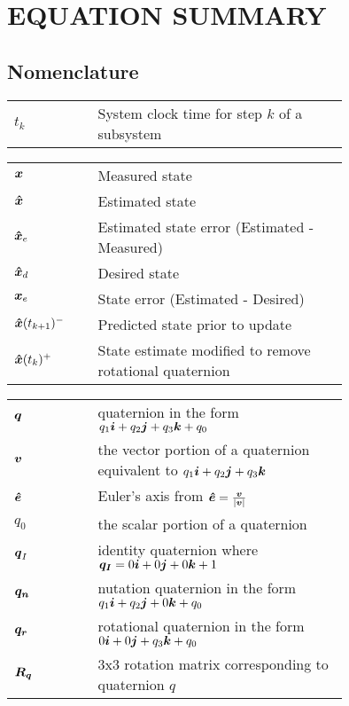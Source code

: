 \chapter{EQUATION SUMMARY}
\label{chap:EquationSummary}

\section{Nomenclature}

\begin{nomenclature}
\begin{tabular}{lp{0.75\linewidth}}
  $t_k$ & System clock time for step $k$ of a subsystem\\
\end{tabular}

\begin{tabular}{lp{0.75\linewidth}}
  $\boldsymbol{x}$ & Measured state \\
  $\boldsymbol{\hat{x}}$ & Estimated state \\
  $\boldsymbol{\hat{x}}_e$ & Estimated state error (Estimated - Measured)\\
  $\boldsymbol{\hat{x}}_d$ & Desired state \\
  $\boldsymbol{x}_e$ & State error (Estimated - Desired) \\
  $\boldsymbol{\hat{x}}(t_{k+1})^-$ & Predicted state prior to update \\
  $\boldsymbol{\hat{x}}(t_k)^+$ & State estimate modified to remove rotational quaternion \\
\end{tabular}

\begin{tabular}{lp{0.75\linewidth}}
  $\boldsymbol{q}$ & quaternion in the form $q_1\boldsymbol{i}+q_2\boldsymbol{j}+q_3\boldsymbol{k}+q_0$ \\
  $\boldsymbol{v}$ & the vector portion of a quaternion equivalent to $q_1\boldsymbol{i}+q_2\boldsymbol{j}+q_3\boldsymbol{k}$ \\
  $\boldsymbol{\hat{e}}$ & Euler's axis from $\boldsymbol{\hat{e}} = \frac{\boldsymbol{v}}{|\boldsymbol{v}|}$ \\
  $q_0$ & the scalar portion of a quaternion \\
  $\boldsymbol{q}_I$ & identity quaternion where $\boldsymbol{q_I} = 0\boldsymbol{i}+0\boldsymbol{j}+0\boldsymbol{k}+1$ \\
  $\boldsymbol{q_n}$ & nutation quaternion in the form $ q_1 \boldsymbol{i} + q_2 \boldsymbol{j} + 0 \boldsymbol{k} + q_0 $ \\
  $\boldsymbol{q_r}$ & rotational quaternion in the form $ 0 \boldsymbol{i} + 0 \boldsymbol{j} + q_3 \boldsymbol{k} + q_0 $ \\
  $\boldsymbol{R_q}$ & 3x3 rotation matrix corresponding to quaternion $q$ \\
\end{tabular}


\end{nomenclature}
